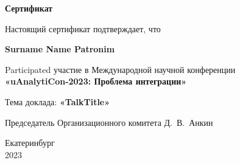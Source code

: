 \documentclass[12pt,a4paper,notitlepage]{article}
\begin{document}
\pagestyle{empty}

\begin{center}

    \textbf{\Huge{Сертификат}}

    \vspace*{15mm}

    Настоящий сертификат подтверждает, что
    
    \vspace*{5mm}
    
    \textbf{\Large{Surname Name Patronim}}
    
    \vspace*{5mm}

    Participated участие в Международной научной конференции\\
    \textbf{«uAnalytiCon-2023: Проблема интеграции»}

    \vspace*{10mm}

    Тема доклада: \textbf{«TalkTitle»}

    \vfill

    \begin{flushleft}
    Председатель Организационного комитета \hfill Д.~В.~Анкин 
    \end{flushleft}
    
    \vfill
    
    \singlespacing
    Екатеринбург\\2023
    
    
\end{center}
\end{document}
